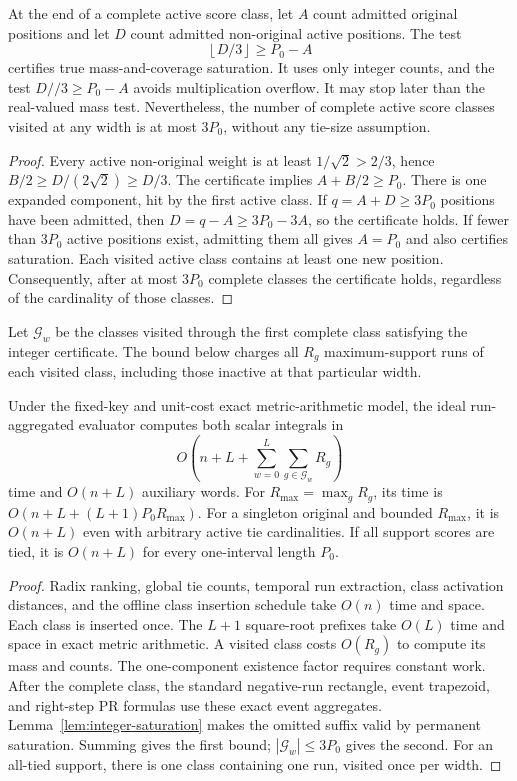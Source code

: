 \begin{lemma}
\label{lem:integer-saturation}
At the end of a complete active score class, let $A$ count admitted original
positions and let $D$ count admitted non-original active positions. The test
\[
 \left\lfloor D/3\right\rfloor\ge P_0-A
 \label{eq:integer-saturation}
\]
certifies true mass-and-coverage saturation. It uses only integer counts,
and the test $D\mathbin{//}3\ge P_0-A$ avoids multiplication overflow.
It may stop later than the real-valued mass test. Nevertheless, the
number of complete active score classes visited at any width is at most
$3P_0$, without any tie-size assumption.
\end{lemma}
\begin{proof}
Every active non-original weight is at least $1/\sqrt2>2/3$, hence
$B/2\ge D/(2\sqrt2)\ge D/3$. The certificate implies
$A+B/2\ge P_0$. There is one expanded component, hit by the first active
class. If $q=A+D\ge3P_0$ positions have been admitted, then
$D=q-A\ge3P_0-3A$, so the certificate holds. If fewer than $3P_0$
active positions exist, admitting them all gives $A=P_0$ and also
certifies saturation. Each visited active class contains at least one
new position. Consequently, after at most $3P_0$ complete classes the
certificate holds, regardless of the cardinality of those classes.
\end{proof}

Let $\mathcal G_w$ be the classes visited through the first complete
class satisfying the integer certificate. The bound below charges all
$R_g$ maximum-support runs of each visited class, including those inactive
at that particular width.

\begin{theorem}
\label{thm:tie-run-bound}
Under the fixed-key and unit-cost exact metric-arithmetic model, the ideal
run-aggregated evaluator computes both scalar integrals in
\[
 O\!\left(n+L+\sum_{w=0}^{L}\sum_{g\in\mathcal G_w}R_g\right)
\]
time and $O(n+L)$ auxiliary words. For
$R_{\max}=\max_g R_g$, its time is
$O(n+L+(L+1)P_0R_{\max})$.
For a singleton original and bounded $R_{\max}$, it is $O(n+L)$ even
with arbitrary active tie cardinalities. If all support scores are tied,
it is $O(n+L)$ for every one-interval length $P_0$.
\end{theorem}
\begin{proof}
Radix ranking, global tie counts, temporal run extraction, class activation
distances, and the offline class insertion schedule take $O(n)$ time and
space. Each class is inserted once. The $L+1$ square-root prefixes take
$O(L)$ time and space in exact metric arithmetic. A visited class costs
$O(R_g)$ to compute its mass and counts. The one-component existence factor
requires constant work. After the complete class, the standard
negative-run rectangle, event trapezoid, and right-step PR formulas use
these exact event aggregates. Lemma~\ref{lem:integer-saturation} makes the
omitted suffix valid by permanent saturation. Summing gives the first
bound; $|\mathcal G_w|\le3P_0$ gives the second. For an all-tied support,
there is one class containing one run, visited once per width.
\end{proof}


